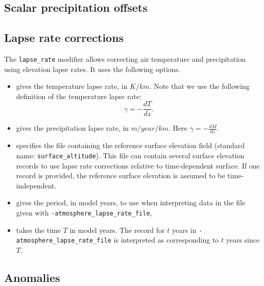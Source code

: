 \documentclass[titlepage,letterpaper,final]{scrartcl}
\begin{document}

\subsection{Scalar precipitation offsets}
\label{sec:atmosphere-delta-precip}


\subsection{Lapse rate corrections}
\label{sec:atmosphere-lapse-rates}

The \texttt{lapse_rate} modifier allows correcting air temperature and
precipitation using elevation lapse rates. It uses the following options.

\begin{itemize}
\item {} gives the temperature lapse rate, in
  $K/km$. Note that we use the following definition of the temperature lapse
  rate:
  \begin{displaymath}
    \gamma = -\frac{dT}{dz}.
  \end{displaymath}
\item {} gives the precipitation lapse rate, in
  $m/year/km$. Here $\gamma = -\frac{dM}{dz}$.
\item {} specifies the file containing the
  reference surface elevation field (standard name:
  \texttt{surface_altitude}). This file can contain several surface elevation
  records to use lapse rate corrections relative to time-dependent surface.
  If one record is provided, the reference surface elevation is assumed to be
  time-independent.
\item {} gives the period, in model
  years, to use when interpreting data in the file given with
  \texttt{-atmosphere_lapse_rate_file},
\item {} takes the time $T$ in
  model years. The record for $t$ years in \texttt{-atmosphere_lapse_rate_file} is
  interpreted as corresponding to $t$ years since $T$.
\end{itemize}


\subsection{Anomalies}
\label{sec:atmosphere-anomaly}
\end{document}
